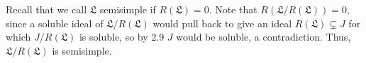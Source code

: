 Recall that we call $\mathfrak{L}$ semisimple if $R(\mathfrak{L}) = 0$.
Note that $R(\mathfrak{L}/R(\mathfrak{L}))= 0$, since a soluble ideal of $\mathfrak{L}/R(\mathfrak{L})$
would pull back to give an ideal $R(\mathfrak{L}) \subsetneq J$ for which
$J/R(\mathfrak{L})$ is soluble, so by 2.9 $J$ would be soluble, a contradiction.
Thus, $\mathfrak{L}/R(\mathfrak{L})$ is semisimple.
